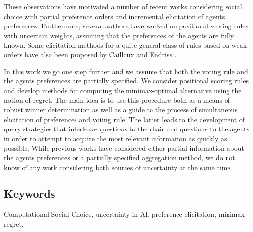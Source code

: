 \documentclass[a4paper]{article}
\begin{document}
These observations have motivated a number of recent works considering social choice with partial preference orders \citep{Xia2008, Pini2009, Konczak05} and incremental elicitation \citep{Kalech2011, Lu2011, Naamani-Dery2015} of agents preferences. Furthermore, several authors \citep{Stein1994, Llamazares2013, Viappiani2018} have worked on positional scoring rules with uncertain weights, assuming that the preferences of the agents are fully known. Some elicitation methods for a quite general class of rules based on weak orders have also been proposed by Cailloux and Endriss \citep{Cailloux2014}.

In this work we go one step further and we assume that both the voting rule and the agents preferences are partially specified. We consider positional scoring rules and develop methods for computing the minimax-optimal alternative using the notion of regret. The main idea is to use this procedure both as a means of robust winner determination as well as a guide to the process of simultaneous elicitation of preferences and voting rule. The latter leads to the development of query strategies that interleave questions to the chair and questions to the agents in order to attempt to acquire the most relevant information as quickly as possible.
While previous works have considered either partial information about the agents preferences or a partially specified aggregation method, we do not know of any work considering both sources of uncertainty at the same time.

\subsection*{Keywords}
Computational Social Choice, uncertainty in AI, preference elicitation, minimax regret.



\end{document}
